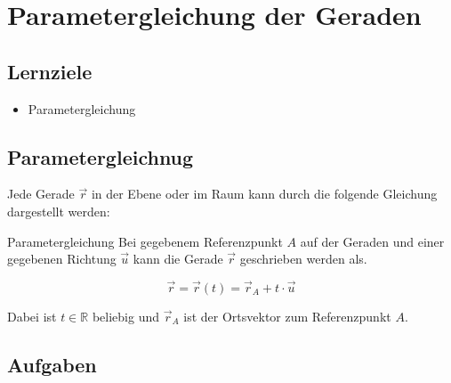 \section{Parametergleichung der Geraden}

\subsection*{Lernziele}
\begin{itemize}
\item Parametergleichung
\end{itemize}




\subsection{Parametergleichnug}
Jede Gerade $\vec{r}$ in der Ebene oder im Raum kann durch die
folgende Gleichung dargestellt werden:

\begin{definition}{Parametergleichung}{}
  Bei gegebenem Referenzpunkt $A$ auf der Geraden und einer gegebenen
  Richtung $\vec{u}$ kann die Gerade $\vec{r}$ geschrieben werden als.
  
  $$\vec{r} = \vec{r}(t) = \vec{r}_A + t\cdot{} \vec{u}$$

  Dabei ist $t\in\mathbb{R}$ beliebig und $\vec{r}_A$ ist der
  Ortsvektor zum Referenzpunkt $A$.
\end{definition}

\subsection*{Aufgaben}
\newpage%
